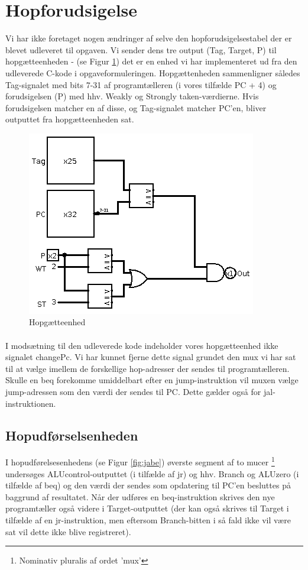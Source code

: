 \documentclass[10pt,a4paper,danish]{article}
\begin{document}
\section{Hopforudsigelse}
Vi har ikke foretaget nogen ændringer af selve den hopforudsigelsestabel der er 
blevet udleveret til opgaven. Vi sender dens tre output (Tag, Target, P) til 
hopgætteenheden - (se Figur \ref{fig:bgu}) det er en enhed vi har implementeret ud
 fra den udleverede C-kode i opgaveformuleringen. Hopgættenheden sammenligner 
således Tag-signalet med bits 7-31 af programtælleren (i vores tilfælde PC + 4)
 og forudsigelsen (P) med hhv. Weakly og Strongly taken-værdierne. Hvis 
forudsigelsen matcher en af disse, og Tag-signalet matcher PC'en, bliver 
outputtet fra hopgætteenheden sat.

\begin{figure}[htb]
\begin{center}
\leavevmode
\includegraphics[scale=0.60]{branch_guessing_unit.png}
\end{center}
\caption{Hopgætteenhed}
\label{fig:bgu} 
\end{figure} 

\paragraph{}
I modsætning til den udleverede kode indeholder vores hopgætteenhed ikke 
signalet changePc. Vi har kunnet fjerne dette signal grundet den mux vi har 
sat til at vælge imellem de forskellige hop-adresser der sendes til 
programtælleren. Skulle en beq forekomme umiddelbart efter en jump-instruktion
vil muxen vælge jump-adressen som den værdi der sendes til PC. Dette gælder
også for jal-instruktionen. 

\subsection{Hopudførselsenheden}
I hopudførelsesenhedens (se Figur \ref{fig:jabe}) øverste segment af to mucer
\footnote{Nominativ pluralis af ordet 'mux'} undersøges ALUcontrol-outputtet 
(i tilfælde af jr) og hhv. Branch og ALUzero (i tilfælde af beq) og den værdi 
der sendes som opdatering til PC'en besluttes på baggrund af resultatet. Når 
der udføres en beq-instruktion skrives den nye programtæller også videre i 
Target-outputtet (der kan også skrives til Target i tilfælde af en jr-instruktion,
men eftersom Branch-bitten i så fald ikke vil være sat vil dette ikke blive registreret).
\end{document}
